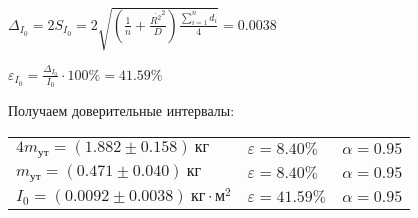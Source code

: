 \begin{enumerate}
    $\displaystyle \Delta_{I_0} = 2S_{{I_0}} = 2\sqrt{\left(\frac{1}{n} + \frac{\overline{R^2}^2}{D}\right) \frac{\sum_{i = 1}^n d_i}{4}} = 0.0038$

    $\displaystyle \varepsilon_{I_0} = \frac{\Delta_{I_0}}{I_0} \cdot 100\% = 41.59\%$

    \clearpage

    Получаем доверительные интервалы:

    \begin{tabular}{lll}
        $4m_{\text{ут}} = (1.882 \pm 0.158) \ \text{кг}$ & $\varepsilon = 8.40\%$ & $\alpha = 0.95$ \\

        $m_{\text{ут}} = (0.471 \pm 0.040) \ \text{кг}$ & $\varepsilon = 8.40\%$ & $\alpha = 0.95$ \\

        $I_0 = (0.0092 \pm 0.0038) \ \text{кг} \cdot \text{м}^2$ & $\varepsilon = 41.59\%$ & $\alpha = 0.95$ \\
    \end{tabular}

    \smallvspace



\end{enumerate}